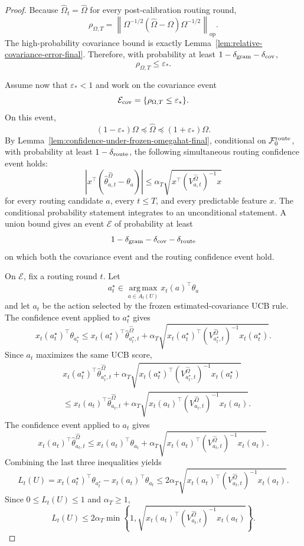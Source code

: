 \documentclass{article} %
\begin{document}
\begin{proof}
Because \(\widehat\Omega_t=\widehat\Omega\) for every post-calibration routing
round,
\[
\rho_{\Omega,T}
=
\left\|
\Omega^{-1/2}(\widehat\Omega-\Omega)\Omega^{-1/2}
\right\|_{\mathrm{op}}.
\]
The high-probability covariance bound is exactly
Lemma~\ref{lem:relative-covariance-error-final}.  Therefore, with probability
at least \(1-\delta_{\rm gram}-\delta_{\rm cov}\),
\[
\rho_{\Omega,T}\le\varepsilon_*.
\]

Assume now that \(\varepsilon_*<1\) and work on the covariance event
\[
\mathcal{E}_{\rm cov}=\{\rho_{\Omega,T}\le\varepsilon_*\}.
\]
On this event,
\[
(1-\varepsilon_*)\Omega
\preceq
\widehat\Omega
\preceq
(1+\varepsilon_*)\Omega.
\]
By Lemma~\ref{lem:confidence-under-frozen-omegahat-final}, conditional on
\(\mathcal F_0^{\rm route}\), with probability at least
\(1-\delta_{\rm route}\), the following simultaneous routing confidence event
holds:
\[
\left|
x^\top(\widehat\theta_{a,t}^{\widehat\Omega}-\theta_a)
\right|
\le
\alpha_T
\sqrt{x^\top(V_{a,t}^{\widehat\Omega})^{-1}x}
\]
for every routing candidate \(a\), every \(t\le T\), and every predictable
feature \(x\). The conditional probability statement integrates to an
unconditional statement. A union bound gives an event \(\mathcal{E}\) of
probability at least
\[
1-\delta_{\rm gram}-\delta_{\rm cov}-\delta_{\rm route}
\]
on which both the covariance event and the routing confidence event hold.

On \(\mathcal{E}\), fix a routing round \(t\).  Let
\[
a_t^\star\in
\operatorname*{arg\,max}_{a\in A_t(U)}
x_t(a)^\top\theta_a
\]
and let \(a_t\) be the action selected by the frozen estimated-covariance UCB
rule.  The confidence event applied to \(a_t^\star\) gives
\[
x_t(a_t^\star)^\top\theta_{a_t^\star}
\le
x_t(a_t^\star)^\top\widehat\theta_{a_t^\star,t}^{\widehat\Omega}
+
\alpha_T
\sqrt{
x_t(a_t^\star)^\top
(V_{a_t^\star,t}^{\widehat\Omega})^{-1}
x_t(a_t^\star)
}.
\]
Since \(a_t\) maximizes the same UCB score,
\[
\begin{aligned}
&
x_t(a_t^\star)^\top\widehat\theta_{a_t^\star,t}^{\widehat\Omega}
+
\alpha_T
\sqrt{
x_t(a_t^\star)^\top
(V_{a_t^\star,t}^{\widehat\Omega})^{-1}
x_t(a_t^\star)
}
\\
&\le
x_t(a_t)^\top\widehat\theta_{a_t,t}^{\widehat\Omega}
+
\alpha_T
\sqrt{
x_t(a_t)^\top
(V_{a_t,t}^{\widehat\Omega})^{-1}
x_t(a_t)
}.
\end{aligned}
\]
The confidence event applied to \(a_t\) gives
\[
x_t(a_t)^\top\widehat\theta_{a_t,t}^{\widehat\Omega}
\le
x_t(a_t)^\top\theta_{a_t}
+
\alpha_T
\sqrt{
x_t(a_t)^\top
(V_{a_t,t}^{\widehat\Omega})^{-1}
x_t(a_t)
}.
\]
Combining the last three inequalities yields
\[
L_t(U)
=
x_t(a_t^\star)^\top\theta_{a_t^\star}
-
x_t(a_t)^\top\theta_{a_t}
\le
2\alpha_T
\sqrt{
x_t(a_t)^\top
(V_{a_t,t}^{\widehat\Omega})^{-1}
x_t(a_t)
}.
\]
Since \(0\le L_t(U)\le1\) and \(\alpha_T\ge1\),
\[
L_t(U)
\le
2\alpha_T
\min\!\left\{
1,
\sqrt{
x_t(a_t)^\top
(V_{a_t,t}^{\widehat\Omega})^{-1}
x_t(a_t)
}
\right\}.
\]


\end{proof}
\end{document}
